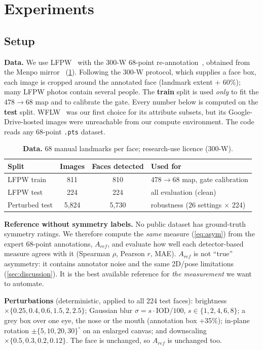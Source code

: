 \section{Experiments}
\label{sec:exp}

\subsection{Setup}
\textbf{Data.} We use LFPW~\cite{belhumeur2011lfpw} with the 300-W 68-point
re-annotation~\cite{sagonas2013_300w,sagonas2016_300w}, obtained from the Menpo
mirror~\cite{menpo_lfpw} (\cref{tab:data}). Following the 300-W protocol, which supplies a
face box, each image is cropped around the annotated face (landmark extent + 60\%);
many LFPW photos contain several people. The \textbf{train} split is used \emph{only} to
fit the 478$\to$68 map and to calibrate the gate. Every number below is computed on the
\textbf{test} split. WFLW~\cite{wu2018lab} was our first choice for its attribute subsets,
but its Google-Drive-hosted images were unreachable from our compute environment. The code
reads any 68-point \texttt{.pts} dataset.

\begin{table}[t]
\centering\footnotesize
\begin{tabular}{@{}lccl@{}}
\toprule
Split & Images & Faces detected & Used for\\
\midrule
LFPW train & 811 & 810 & 478$\to$68 map, gate calibration\\
LFPW test & 224 & 224 & all evaluation (clean)\\
Perturbed test & 5{,}824 & 5{,}730 & robustness (26 settings $\times$ 224)\\
\bottomrule
\end{tabular}
\caption{\textbf{Data.} 68 manual landmarks per face; research-use licence (300-W).}
\label{tab:data}
\end{table}

\textbf{Reference without symmetry labels.} No public dataset has ground-truth symmetry
ratings. We therefore compute the \emph{same} measure (\cref{eq:asym}) from the expert
68-point annotations, $A_{ref}$, and evaluate how well each detector-based measure agrees
with it (Spearman $\rho$, Pearson $r$, MAE). $A_{ref}$ is not ``true'' asymmetry: it
contains annotator noise and the same 2D/pose limitations (\cref{sec:discussion}). It is
the best available reference for \emph{the measurement} we want to automate.

\textbf{Perturbations} (deterministic, applied to all 224 test faces): brightness
$\times\{0.25,0.4,0.6,1.5,2,2.5\}$; Gaussian blur $\sigma\!=\!s\cdot\mathrm{IOD}/100$,
$s\!\in\!\{1,2,4,6,8\}$; a grey box over one eye, the nose or the mouth (annotation box
+35\%); in-plane rotation $\pm\{5,10,20,30\}^\circ$ on an enlarged canvas; and downscaling
$\times\{0.5,0.3,0.2,0.12\}$. The face is unchanged, so $A_{ref}$ is unchanged too.


